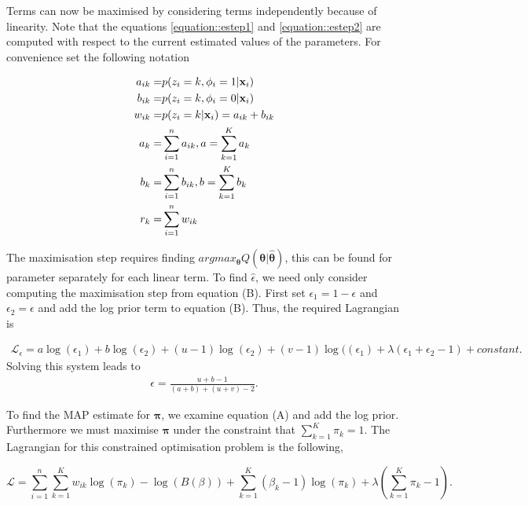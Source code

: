 \documentclass[12pt,english]{article}\usepackage[]{graphicx}\usepackage[]{color}
\begin{document}
Terms can now be maximised by considering terms independently because of linearity. Note that the equations \ref{equation::estep1} and \ref{equation::estep2} are computed with respect to the current estimated values of the parameters. For convenience set the following notation

\begin{equation}\label{equation::estepfinalapp}
\begin{split}
a_{ik} = & p(z_i = k, \phi_i = 1|{\bf x}_i)\\
b_{ik} = & p(z_i = k, \phi_i = 0|{\bf x}_i) \\
w_{ik} = & p(z_i = k|{\bf x}_i) = a_{ik} + b_{ik}\\
a_k = & \sum_{i=1}^{n}a_{ik}, a = \sum_{k=1}^{K}a_k \\
b_k = & \sum_{i=1}^{n}b_{ik}, b = \sum_{k=1}^{K}b_k \\
r_k = & \sum_{i=1}^{n}w_{ik}
\end{split}
\end{equation}

The maximisation step requires finding
$argmax_{\boldsymbol{\theta}}Q(\boldsymbol{\theta}|\boldsymbol{\hat{\theta}})$,
this can be found for parameter separately for each linear term. To
find $\hat{\epsilon}$, we need only consider computing the
maximisation step from equation (B). First set
$\epsilon_1 = 1 - \epsilon$ and $\epsilon_2 = \epsilon$ and add the
log prior term to equation (B). Thus, the required Lagrangian is

\begin{equation}
\begin{split}
\mathcal{L}_{\epsilon} = a\log(\epsilon_1) + b\log(\epsilon_2) + (u-1)\log(\epsilon_2) + (v-1)\log((\epsilon_1) + \lambda(\epsilon_1 + \epsilon_2 - 1) +  constant.
\end{split}
\end{equation}
Solving this system leads to
\begin{equation}
\begin{split}
\epsilon = \frac{ u + b - 1}{(a+b) + (u+v) - 2}.
\end{split}
\end{equation}

To find the MAP estimate for $\boldsymbol{\pi}$, we examine equation
(A) and add the log prior.  Furthermore we must maximise
$\boldsymbol{\pi}$ under the constraint that
$\sum_{k=1}^{K}\pi_k = 1$. The Lagrangian for this constrained
optimisation problem is the following,

\begin{equation}
\mathcal{L}= \sum_{i=1}^{n}\sum_{k=1}^{K}w_{ik}\log(\pi_k) - \log(B(\beta)) + \sum_{k=1}^{K}(\beta_k - 1)\log(\pi_k) + \lambda\left(\sum_{k=1}^{K}\pi_k-1\right).
\end{equation}
\end{document}
